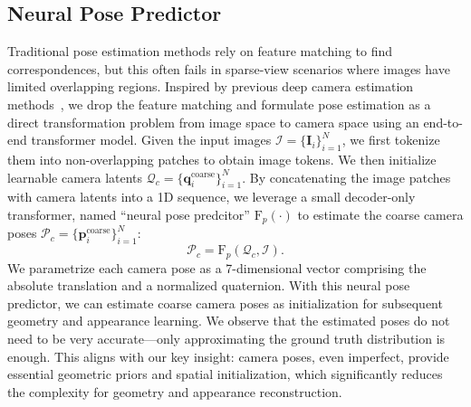 





\subsection{Neural Pose Predictor}
\label{method:pose}
Traditional pose estimation methods rely on feature matching to find correspondences, but this often fails in sparse-view scenarios where images have limited overlapping regions. 
%
Inspired by previous deep camera estimation methods~\cite{wang2023posediffusion, wang2024vggsfm}, we drop the feature matching and formulate pose estimation as a direct transformation problem from image space to camera space using an end-to-end transformer model. Given the input images $\mathcal{I} = \{\mathbf{I}_i\}_{i=1}^{N}$,  we first tokenize them into non-overlapping patches to obtain image tokens. We then initialize learnable camera latents $\mathcal{Q}_{c} = \{\mathbf{q}^{\text{coarse}}_i\}_{i=1}^{N}$. By concatenating the image patches with camera latents into a 1D sequence, we leverage a small decoder-only transformer, named ``neural pose predcitor'' $\mathrm{F}_p(\cdot)$ to estimate the coarse camera poses $\mathcal{P}_{c} = \{\mathbf{p}^{\text{coarse}}_i\}_{i=1}^{N}$:
\begin{equation}
\mathcal{P}_{c} = \mathrm{F}_p(\mathcal{Q}_{c}, \mathcal{I}).
\end{equation}
We parametrize each camera pose as a 7-dimensional vector comprising the absolute translation and a normalized quaternion. 
With this neural pose predictor, we can estimate coarse camera poses as initialization for subsequent geometry and appearance learning. 
%
We observe that the estimated poses do not need to be very accurate---only approximating the ground truth distribution is enough. This aligns with our key insight: camera poses, even imperfect, provide essential geometric priors and spatial initialization, which significantly reduces the complexity for geometry and appearance reconstruction. 

